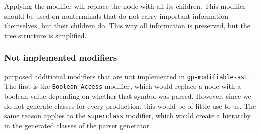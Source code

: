 Applying the modifier will replace the node with all its children. 
This modifier should be used on nonterminals that do not carry important information themselves, but their children do. 
This way all information is preserved, but the tree structure is simplified.

\subsubsection{Not implemented modifiers}

\cite{GeneratingRewritableAST} purposed additional modifiers that are not implemented in \verb|gp-modifiable-ast|.
The first is the \verb|Boolean Access| modifier, which would replace a node with a boolean value depending on whether that symbol was parsed. 
However, since we do not generate classes for every production, this would be of little use to us.
The same reason applies to the \verb|superclass| modifier, which would create a hierarchy in the generated classes of the parser generator.
